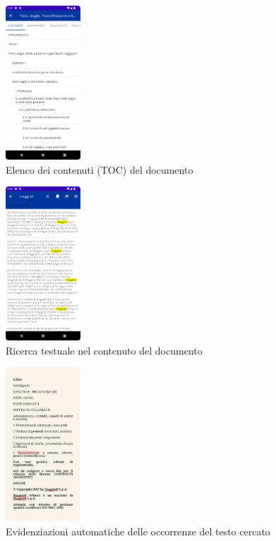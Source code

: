 \begin{multicols}{3}
            \begin{figure}[H]
                \centering
                \includegraphics[width=0.25\textwidth]{img/toc.png}
                \caption{Elenco dei contenuti (TOC) del documento}
                \label{toc-android}
            \end{figure}
            
            \begin{figure}[H]
                \centering
                \includegraphics[width=0.25\textwidth]{img/ricerca_testo.png}
                \caption{Ricerca testuale nel contenuto del documento}
                \label{ricerca_testo-android}
            \end{figure}
            
            \begin{figure}[H]
                \centering
                \includegraphics[width=0.25\textwidth]{img/ricerca_testo2.png}
                \caption{Evidenziazioni automatiche delle occorrenze del testo cercato}
                \label{ricerca_testo2-android}
            \end{figure}
\end{multicols}

